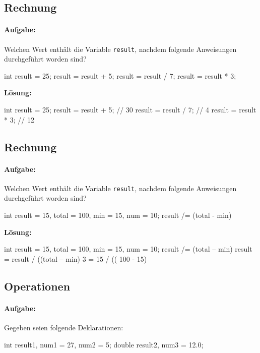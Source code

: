 \documentclass[a4paper,10pt, dvipsnames]{report}
\begin{document}
\subsection{Rechnung}

\paragraph{Aufgabe:}
Welchen Wert enthält die Variable \texttt{result}, nachdem folgende Anweisungen durchgeführt worden sind?
\begin{javacodebox}
int result = 25;
result = result + 5;
result = result / 7;
result = result * 3;    
\end{javacodebox}



\textbf{Lösung:}
\begin{javacodebox}
int result = 25;
result = result + 5; // 30
result = result / 7; // 4
result = result * 3; // 12
\end{javacodebox}

\subsection{Rechnung}

\paragraph{Aufgabe:}
Welchen Wert enthält die Variable \texttt{result}, nachdem folgende Anweisungen durchgeführt worden sind?
\begin{javacodebox}
int result = 15, total = 100, min = 15, num = 10;
result /= (total - min) %
\end{javacodebox}

\textbf{Lösung:}
\begin{javacodebox}
int result = 15, total = 100, min = 15, num = 10;
result /= (total – min) %
result = result / ((total – min) %
3 = 15 / (( 100 - 15) %
\end{javacodebox}

\subsection{Operationen}

\paragraph{Aufgabe:}
Gegeben seien folgende Deklarationen:
\begin{javacodebox}
int result1, num1 = 27, num2 = 5;
double result2, num3 = 12.0;
\end{javacodebox}
\end{document}

